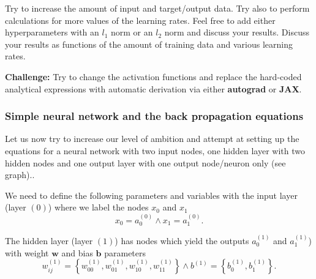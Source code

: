 \documentclass{beamer}
\newenvironment{doconceexercise}{}{}
\newcounter{doconceexercisecounter}
\newcounter{doconce:movie:counter}
\begin{document}
\begin{frame}

\begin{doconceexercise}

                             

Try to increase the amount of input and
target/output data. Try also to perform calculations for more values
of the learning rates. Feel free to add either hyperparameters with an
$l_1$ norm or an $l_2$ norm and discuss your results.
Discuss your results as functions of the amount of training data and various learning rates.

\textbf{Challenge:} Try to change the activation functions and replace the hard-coded analytical expressions with automatic derivation via either \textbf{autograd} or \textbf{JAX}.

\end{doconceexercise}
\end{frame}

\begin{frame}
\frametitle{Simple neural network and the  back propagation equations}

Let us now try to increase our level of ambition and attempt at setting 
up the equations for a neural network with two input nodes, one hidden
layer with two hidden nodes and one output layer with one output node/neuron only (see graph)..

We need to define the following parameters and variables with the input layer (layer $(0)$) 
where we label the  nodes $x_0$ and $x_1$
\[
x_0 = a_0^{(0)} \wedge x_1 = a_1^{(0)}.
\]

The  hidden layer (layer $(1)$) has  nodes which yield the outputs $a_0^{(1)}$ and $a_1^{(1)}$) with  weight $\bm{w}$ and bias $\bm{b}$ parameters
\[
w_{ij}^{(1)}=\left\{w_{00}^{(1)},w_{01}^{(1)},w_{10}^{(1)},w_{11}^{(1)}\right\} \wedge b^{(1)}=\left\{b_0^{(1)},b_1^{(1)}\right\}.
\]
\end{frame}
\end{document}
